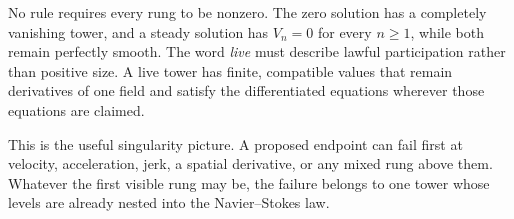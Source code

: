No rule requires every rung to be nonzero.
The zero solution has a completely vanishing tower, and a steady solution has \(V_n=0\) for every \(n\geq1\), while both remain perfectly smooth.
The word \emph{live} must describe lawful participation rather than positive size.
A live tower has finite, compatible values that remain derivatives of one field and satisfy the differentiated equations wherever those equations are claimed.

This is the useful singularity picture.
A proposed endpoint can fail first at velocity, acceleration, jerk, a spatial derivative, or any mixed rung above them.
Whatever the first visible rung may be, the failure belongs to one tower whose levels are already nested into the Navier--Stokes law.

